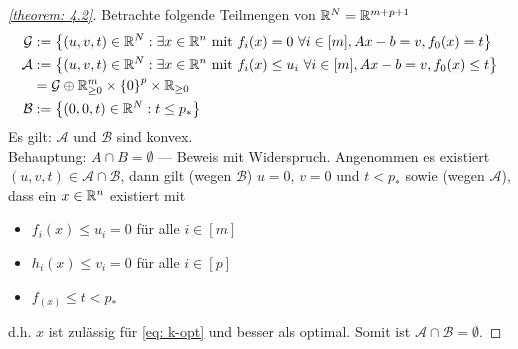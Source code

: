 \begin{proof}[\cref{theorem: 4.2}]
	Betrachte folgende Teilmengen von $\mathbb{R}^N = \mathbb{R}^{m+p+1}$
	\begin{equation*}
		\begin{aligned}
			\mathcal{G} &\mathrel{:=} \left\{ (u,v,t) \in \mathbb{R}^N : \exists x \in \mathbb{R}^n \text{ mit } f_i(x) = 0 \ \forall i \in [m] , Ax - b = v, f_0(x) = t \right\} \\
			\mathcal{A} &\mathrel{:=} \left\{ (u,v,t) \in \mathbb{R}^N : \exists x \in \mathbb{R}^n \text{ mit } f_i(x) \le u_i \ \forall i \in [m], Ax - b = v, f_0(x) \le t \right\} \\
			&= \mathcal{G} \oplus \mathbb{R}^m_{\ge 0} \times \left\{ 0 \right\}^p \times \mathbb{R}_{\ge 0} \\
			\mathcal{B} &\mathrel{:=} \left\{ (0,0,t) \in \mathbb{R}^N : t \le p_\ast \right\}
		\end{aligned}
	\end{equation*}
	Es gilt: $\mathcal{A}$ und $\mathcal{B}$ sind konvex. \\
	Behauptung: $A \cap B = \emptyset$ --- Beweis mit Widerspruch. Angenommen es existiert $(u,v,t) \in \mathcal{A} \cap \mathcal{B}$, dann gilt (wegen $\mathcal{B}$) $u = 0$, $v=0$ und $t < p_\ast$ sowie (wegen $\mathcal{A}$), dass ein $x \in \mathbb{R}^n$ existiert mit 
	\begin{itemize}
		\item $f_i(x) \le u_i = 0$ für alle $i \in [m]$ 
		\item $h_i(x) \le v_i = 0$ für alle $i \in [p]$
		\item $f_(x) \le t < p_\ast$ 
	\end{itemize}
	d.h. $x$ ist zulässig für \eqref{eq: k-opt} und besser als optimal.
	Somit ist $\mathcal{A} \cap \mathcal{B} = \emptyset$.
	

\end{proof}
